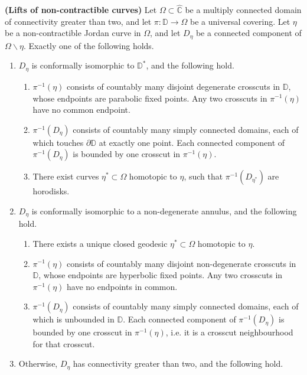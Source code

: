 \documentclass[10pt,a4paper]{amsart}
\def\DD{\mathbb{D}}
\begin{document}
\begin{lemma}{\bf (Lifts of non-contractible curves)}\label{lemma-lifts-of-curves}
	Let $ \Omega \subset \widehat{\mathbb{C}}$ be a multiply connected domain of connectivity greater than two, and let $ \pi\colon\mathbb{D}\to \Omega $ be a universal covering. Let $ \eta $ be a non-contractible Jordan curve in $ \Omega $, and let $ D_\eta $ be a connected component of $ \Omega\smallsetminus\eta $. Exactly one of the following holds. \begin{enumerate}[label={\em (\alph*)}] 
			\item  $D_\eta $ is conformally isomorphic to $ \mathbb{D}^* $, and the following hold.
		\begin{enumerate}[label={\em a.\arabic*}]
			\item $ \pi^{-1}(\eta) $ consists of  countably many disjoint degenerate crosscuts in $ \mathbb{D} $, whose endpoints are parabolic fixed points. Any two crosscuts in $ \pi^{-1}(\eta) $ have no  common endpoint.
			\item $ \pi^{-1}(D_\eta) $ consists of countably many simply connected domains, each of which touches $\partial\DD$ at exactly one point. Each connected component of $ \pi^{-1}(D_\eta) $ is bounded by one crosscut in $ \pi^{-1}(\eta) $.
			\item There exist curves $\eta^*\subset\Omega$ homotopic to $\eta$, such that $ \pi^{-1}(D_{\eta^*}) $ are horodisks.
		\end{enumerate}
		\item  $ D_\eta $ is conformally isomorphic to a non-degenerate annulus, and the following hold.
		\begin{enumerate}[label={\em b.\arabic*}]
			\item There exists a unique closed geodesic $\eta^*\subset\Omega$ homotopic to $\eta$.
				\item $ \pi^{-1}(\eta) $ consists of  countably many disjoint non-degenerate crosscuts in $ \mathbb{D} $, whose endpoints are hyperbolic fixed points. Any two crosscuts in $ \pi^{-1}(\eta) $ have no endpoints in common.
			\item $ \pi^{-1}(D_\eta) $ consists of countably many simply connected domains, each of which is unbounded in $ \mathbb{D} $. Each connected component of $ \pi^{-1}(D_\eta) $ is bounded by one crosscut in $ \pi^{-1}(\eta) $, i.e. it is a crosscut neighbourhood for that crosscut.
		\end{enumerate}
		\item Otherwise, $ D_\eta $ has connectivity greater than two, and the following hold.

\end{enumerate}
\end{lemma}
\end{document}
